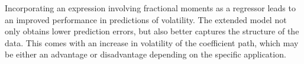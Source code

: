 Incorporating an expression involving fractional moments as a regressor leads to an improved performance in predictions of volatility. The extended model not only obtains lower prediction errors, but also better captures the structure of the data. This comes with an increase in volatility of the coefficient path, which may be either an advantage or disadvantage depending on the specific application. 